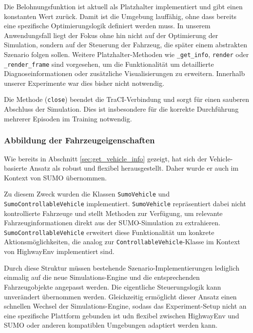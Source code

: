 Die Belohnungsfunktion ist aktuell als Platzhalter implementiert und gibt einen konstanten Wert zurück. Damit ist die Umgebung lauffähig, ohne dass bereits eine spezifische Optimierungslogik definiert werden muss. In unserem Anwendungsfall liegt der Fokus ohne hin nicht auf der Optimierung der Simulation, sondern auf der Steuerung der Fahrzeug, die später einem abstrakten Szenario folgen sollen. Weitere Platzhalter-Methoden wie \texttt{\_get\_info}, \texttt{render} oder \texttt{\_render\_frame} sind vorgesehen, um die Funktionalität um detaillierte Diagnoseinformationen oder zusätzliche Visualisierungen zu erweitern. Innerhalb unserer Experimente war dies bisher nicht notwendig.

Die Methode (\texttt{close}) beendet die TraCI-Verbindung und sorgt für einen sauberen Abschluss der Simulation. Dies ist insbesondere für die korrekte Durchführung mehrerer Episoden im Training notwendig.
\subsubsection{Abbildung der Fahrzeugeigenschaften}
Wie bereits in Abschnitt \ref{sec:get_vehicle_info} gezeigt, hat sich der Vehicle-basierte Ansatz als robust und flexibel herausgestellt. Daher wurde er auch im Kontext von SUMO übernommen.

Zu diesem Zweck wurden die Klassen \texttt{SumoVehicle} und \texttt{SumoControllableVehicle} implementiert. \texttt{SumoVehicle} repräsentiert dabei nicht kontrollierte Fahrzeuge und stellt Methoden zur Verfügung, um relevante Fahrzeuginformationen direkt aus der SUMO-Simulation zu extrahieren. \texttt{SumoControllableVehicle} erweitert diese Funktionalität um konkrete Aktionsmöglichkeiten, die analog zur \texttt{ControllableVehicle}-Klasse im Kontext von HighwayEnv implementiert sind.

Durch diese Struktur müssen bestehende Szenario-Implementierungen lediglich einmalig auf die neue Simulations-Engine und die entsprechenden Fahrzeugobjekte angepasst werden. Die eigentliche Steuerungslogik kann unverändert übernommen werden. Gleichzeitig ermöglicht dieser Ansatz einen schnellen Wechsel der Simulations-Engine, sodass das Experiment-Setup nicht an eine spezifische Plattform gebunden ist udn flexibel zwischen HighwayEnv und SUMO oder anderen kompatiblen Umgebungen adaptiert werden kann.

